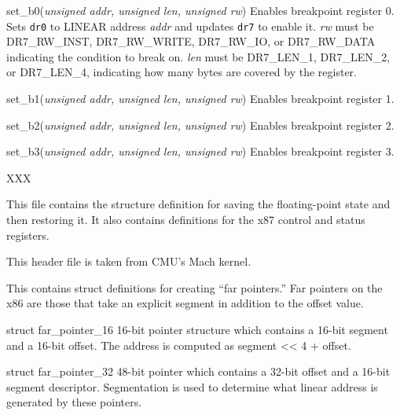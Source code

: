 \begin{apidesc}
\begin{csymlist}
	\item[set_b0(\emph{unsigned addr, unsigned len, unsigned rw})]
		Enables breakpoint register 0.
		Sets {\tt dr0} to LINEAR address \emph{addr}
		and updates {\tt dr7} to enable it.
		\emph{rw} must be DR7_RW_INST, DR7_RW_WRITE, DR7_RW_IO,
		or DR7_RW_DATA indicating the condition to break on.
		\emph{len} must be DR7_LEN_1, DR7_LEN_2, or DR7_LEN_4,
		indicating how many bytes are covered by the register.
	\item[set_b1(\emph{unsigned addr, unsigned len, unsigned rw})]
		Enables breakpoint register 1.
	\item[set_b2(\emph{unsigned addr, unsigned len, unsigned rw})]
		Enables breakpoint register 2.
	\item[set_b3(\emph{unsigned addr, unsigned len, unsigned rw})]
		Enables breakpoint register 3.
	\end{csymlist}
\end{apidesc}

\begin{apisyn}
\end{apisyn}
\begin{apidesc}
	XXX

	This file contains the structure definition for saving the
	floating-point state and then restoring it.
	It also contains definitions for the x87 control and status
	registers.

	This header file is taken from CMU's Mach kernel.
\end{apidesc}

\begin{apisyn}
\end{apisyn}
\begin{apidesc}
	This contains struct definitions for creating ``far pointers.''
	Far pointers on the x86 are those that take an explicit
	segment in addition to the offset value.

	\begin{csymlist}
	\item[struct far_pointer_16]
		16-bit pointer structure which
		contains a 16-bit segment and a 16-bit offset.
		The address is computed as segment << 4 + offset.

	\item[struct far_pointer_32]
		48-bit pointer which contains
		a 32-bit offset and a 16-bit segment descriptor.
		Segmentation is used to determine what linear address
		is generated by these pointers.
	\end{csymlist}
\end{apidesc}

